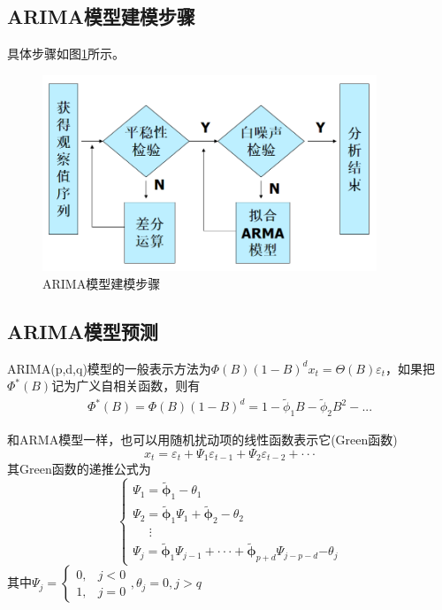 \documentclass[12pt, a4paper, oneside]{ctexbook}
\begin{document}
\subsection{ARIMA模型建模步骤}
具体步骤如图\ref{im5_3}所示。
\begin{figure}[H]
    \centering
    \includegraphics[width = 10cm]{img/5_3.png}
    \caption{ARIMA模型建模步骤}
    \label{im5_3}
\end{figure}

\subsection{ARIMA模型预测}
ARIMA(p,d,q)模型的一般表示方法为$\Phi(B)(1-B)^dx_t=\Theta(B)\varepsilon_t$，如果把$\Phi^*(B)$记为广义自相关函数，则有
$$
    \begin{matrix}
        \Phi^{*}(B)=\Phi(B)(1-B)^{d}=1-\tilde{\phi}_{1}B-\tilde{\phi}_{2}B^{2}-...
    \end{matrix}
$$

和ARMA模型一样，也可以用随机扰动项的线性函数表示它(Green函数)
$$
    x_t=\varepsilon_t+\Psi_1\varepsilon_{t-1}+\Psi_2\varepsilon_{t-2}+\cdotp\cdotp\cdotp
$$
其Green函数的递推公式为
$$
    \begin{cases}
        \Psi_1=\widetilde{\boldsymbol{\phi}}_1-\theta_1                                       \\
        \Psi_2=\widetilde{\boldsymbol{\phi}}_1\Psi_1+\widetilde{\boldsymbol{\phi}}_2-\theta_2 \\
        ~~~~~~\vdots                                                                          \\
        \Psi_j=\widetilde{\boldsymbol{\phi}}_1\Psi_{j-1}+\cdotp\cdotp\cdotp+\widetilde{\boldsymbol{\phi}}_{p+d}\Psi_{j-p-d}\boldsymbol{-}\theta_j
    \end{cases}
$$
其中$\Psi_j=
    \begin{cases}
        0, & j<0 \\
        1, & j=0\end{cases}
    ,\theta_j=0,j>q$
\end{document}
